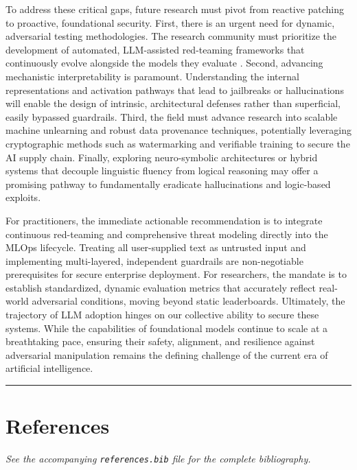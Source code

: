 \documentclass[11pt,a4paper]{article}
\begin{document}
To address these critical gaps, future research must pivot from reactive patching to proactive, foundational security. First, there is an urgent need for dynamic, adversarial testing methodologies. The research community must prioritize the development of automated, LLM-assisted red-teaming frameworks that continuously evolve alongside the models they evaluate \cite{Perez2022}. Second, advancing mechanistic interpretability is paramount. Understanding the internal representations and activation pathways that lead to jailbreaks or hallucinations will enable the design of intrinsic, architectural defenses rather than superficial, easily bypassed guardrails. Third, the field must advance research into scalable machine unlearning and robust data provenance techniques, potentially leveraging cryptographic methods such as watermarking and verifiable training to secure the AI supply chain. Finally, exploring neuro-symbolic architectures or hybrid systems that decouple linguistic fluency from logical reasoning may offer a promising pathway to fundamentally eradicate hallucinations and logic-based exploits.

For practitioners, the immediate actionable recommendation is to integrate continuous red-teaming and comprehensive threat modeling directly into the MLOps lifecycle. Treating all user-supplied text as untrusted input and implementing multi-layered, independent guardrails are non-negotiable prerequisites for secure enterprise deployment. For researchers, the mandate is to establish standardized, dynamic evaluation metrics that accurately reflect real-world adversarial conditions, moving beyond static leaderboards. Ultimately, the trajectory of LLM adoption hinges on our collective ability to secure these systems. While the capabilities of foundational models continue to scale at a breathtaking pace, ensuring their safety, alignment, and resilience against adversarial manipulation remains the defining challenge of the current era of artificial intelligence.

\noindent\rule{\textwidth}{0.4pt}
\section{References}

\textit{See the accompanying \texttt{references.bib} file for the complete bibliography.}




\end{document}
